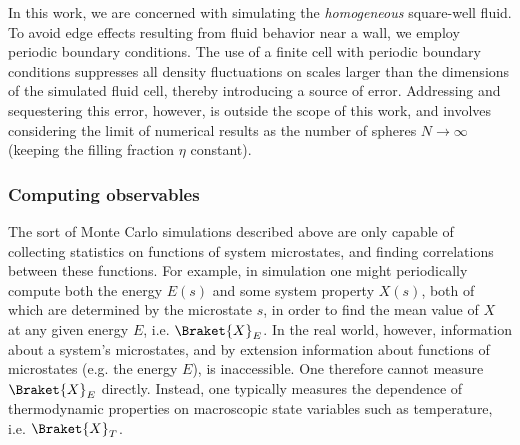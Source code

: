 \documentclass[11pt]{article}
\newcommand{\bk}{\Braket} %
\newcommand{\p}[1]{\left(#1\right)} %
\begin{document}
In this work, we are concerned with simulating the \emph{homogeneous}
square-well fluid. To avoid edge effects resulting from fluid behavior
near a wall, we employ periodic boundary conditions. The use of a
finite cell with periodic boundary conditions suppresses all density
fluctuations on scales larger than the dimensions of the simulated
fluid cell, thereby introducing a source of error. Addressing and
sequestering this error, however, is outside the scope of this work,
and involves considering the limit of numerical results as the number
of spheres $N\to\infty$ (keeping the filling fraction $\eta$
constant).

\subsubsection{Computing observables}
\label{sec:computing_observables}

The sort of Monte Carlo simulations described above are only capable
of collecting statistics on functions of system microstates, and
finding correlations between these functions. For example, in
simulation one might periodically compute both the energy $E\p{s}$ and
some system property $X\p{s}$, both of which are determined by the
microstate $s$, in order to find the mean value of $X$ at any given
energy $E$, i.e. $\bk{X}_E$. In the real world, however, information
about a system's microstates, and by extension information about
functions of microstates (e.g. the energy $E$), is inaccessible. One
therefore cannot measure $\bk{X}_E$ directly. Instead, one typically
measures the dependence of thermodynamic properties on macroscopic
state variables such as temperature, i.e. $\bk{X}_T$.
\end{document}
